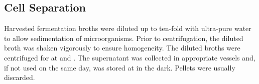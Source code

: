 \subsection{Cell Separation}
Harvested fermentation broths were diluted up to ten-fold with ultra-pure water to allow sedimentation of microorganisms. Prior to centrifugation, the diluted broth was shaken vigorously to ensure homogeneity. The diluted broths were centrifuged for  at  and . The supernatant was collected in appropriate vessels and, if not used on the same day, was stored at  in the dark. Pellets were usually discarded.

